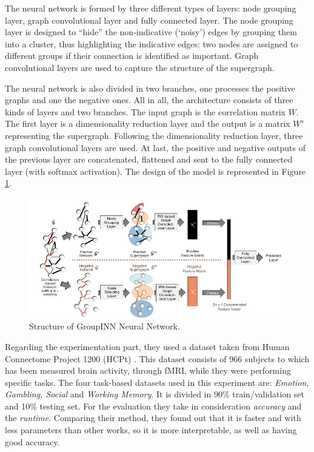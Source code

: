 The neural network is formed by three different types of layers: node grouping layer, graph convolutional layer and fully connected layer. The node grouping layer is designed to “hide” the non-indicative (‘noisy’) edges by grouping them into a cluster, thus highlighting the indicative edges: two nodes are assigned to different groups if their connection is identified as important.
Graph convolutional layers are used to capture the structure of the supergraph.
\vspace{0.5cm}

The neural network is also divided in two branches, one processes the positive graphs and one the negative ones. 
All in all, the architecture consists of three kinds of layers and two branches. 
The input graph is the correlation matrix $W$. The first layer is a dimensionality reduction layer and the output is a matrix $W^{s}$ representing the supergraph. Following the dimensionality reduction layer, three graph convolutional layers are used. At last, the positive and negative outputs of the previous layer are concatenated, flattened and sent to the fully connected layer (with softmax activation). The design of the model is represented in Figure \ref{fig:diagram5}.
\vspace{0.5cm}

\begin{figure}[htbp]
	\centering
	\includegraphics[scale=0.65]{Immagini/Groupinn1.PNG}
	\caption{Structure of GroupINN Neural Network.}
	\label{fig:diagram5}
\end{figure}

Regarding the experimentation part, they used a dataset taken from Human Connectome Project 1200 (HCPt) \cite{hcp}. 
This dataset consists of 966 subjects to which has been measured brain activity, through fMRI, while they were performing specific tasks. The four task-based datasets used in this experiment are: \textit{Emotion, Gambling, Social} and \textit{Working Memory}. It is divided in 90\% train/validation set and 10\% testing set. For the evaluation they take in consideration \textit{accuracy} and the \textit{runtime}. Comparing their method, they found out that it is faster and with less parameters than other works, so it is more interpretable, as well as having good accuracy.

